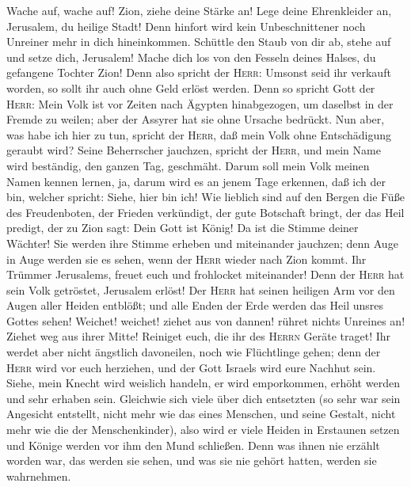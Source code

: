  Wache auf, wache auf! Zion, ziehe deine Stärke an! Lege
deine Ehrenkleider an, Jerusalem, du heilige Stadt! Denn hinfort wird
kein Unbeschnittener noch Unreiner mehr in dich hineinkommen.
 Schüttle den Staub von dir ab, stehe auf und setze dich,
Jerusalem! Mache dich los von den Fesseln deines Halses, du gefangene
Tochter Zion!  Denn also spricht der \textsc{Herr}:
Umsonst seid ihr verkauft worden, so sollt ihr auch ohne Geld erlöst
werden.  Denn so spricht Gott der \textsc{Herr}: Mein Volk
ist vor Zeiten nach Ägypten hinabgezogen, um daselbst in der Fremde zu
weilen; aber der Assyrer hat sie ohne Ursache bedrückt. 
Nun aber, was habe ich hier zu tun, spricht der \textsc{Herr}, daß mein
Volk ohne Entschädigung geraubt wird? Seine Beherrscher jauchzen,
spricht der \textsc{Herr}, und mein Name wird beständig, den ganzen Tag,
geschmäht.  Darum soll mein Volk meinen Namen kennen
lernen, ja, darum wird es an jenem Tage erkennen, daß ich der bin,
welcher spricht: Siehe, hier bin ich!  Wie lieblich sind
auf den Bergen die Füße des Freudenboten, der Frieden verkündigt, der
gute Botschaft bringt, der das Heil predigt, der zu Zion sagt:
 Dein Gott ist König! Da ist die Stimme deiner Wächter!
Sie werden ihre Stimme erheben und miteinander jauchzen; denn Auge in
Auge werden sie es sehen, wenn der \textsc{Herr} wieder nach Zion kommt.
 Ihr Trümmer Jerusalems, freuet euch und frohlocket
miteinander! Denn der \textsc{Herr} hat sein Volk getröstet, Jerusalem
erlöst!  Der \textsc{Herr} hat seinen heiligen Arm vor
den Augen aller Heiden entblößt; und alle Enden der Erde werden das Heil
unsres Gottes sehen!  Weichet! weichet! ziehet aus von
dannen! rühret nichts Unreines an! Ziehet weg aus ihrer Mitte! Reiniget
euch, die ihr des \textsc{Herrn} Geräte traget!  Ihr
werdet aber nicht ängstlich davoneilen, noch wie Flüchtlinge gehen; denn
der \textsc{Herr} wird vor euch herziehen, und der Gott Israels wird
eure Nachhut sein.  Siehe, mein Knecht wird weislich
handeln, er wird emporkommen, erhöht werden und sehr erhaben sein.
 Gleichwie sich viele über dich entsetzten (so sehr war
sein Angesicht entstellt, nicht mehr wie das eines Menschen, und seine
Gestalt, nicht mehr wie die der Menschenkinder),  also
wird er viele Heiden in Erstaunen setzen und Könige werden vor ihm den
Mund schließen. Denn was ihnen nie erzählt worden war, das werden sie
sehen, und was sie nie gehört hatten, werden sie wahrnehmen.

